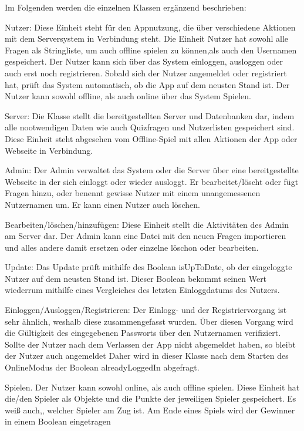\documentclass[fontsize=12pt,paper=a4,twoside]{scrartcl}
\begin{document}
Im Folgenden werden die einzelnen Klassen ergänzend beschrieben:

Nutzer:
Diese Einheit steht für den Appnutzung, die über verschiedene Aktionen
mit dem Serversystem in Verbindung steht. Die Einheit Nutzer hat sowohl 
alle Fragen als Stringliste, um auch offline spielen zu können,als auch 
den Usernamen gespeichert. 
Der Nutzer kann sich über das System einloggen, ausloggen oder auch erst noch 
registrieren.
Sobald sich der Nutzer angemeldet oder registriert hat, prüft das System automatisch,
ob die App auf dem neusten Stand ist. Der Nutzer kann sowohl offline, als auch online 
über das System Spielen.

Server:
Die Klasse stellt die bereitgestellten Server und Datenbanken dar, indem alle 
nootwendigen Daten wie auch Quizfragen und Nutzerlisten gespeichert sind. Diese Einheit
steht abgesehen vom Offline-Spiel mit allen Aktionen der App oder Webseite in Verbindung.

Admin: 
Der Admin verwaltet das System oder die Server über eine bereitgestellte Webseite in der
sich einloggt oder wieder ausloggt. Er bearbeitet/löscht oder fügt Fragen hinzu, oder 
benennt gewisse Nutzer mit einem unangemessenen Nutzernamen um. Er kann einen Nutzer auch
löschen.

Bearbeiten/löschen/hinzufügen:
Diese Einheit stellt die Aktivitäten des Admin am Server dar. Der Admin kann eine Datei 
mit den neuen Fragen importieren und alles andere damit ersetzen oder einzelne löschon 
oder bearbeiten.

Update:
Das Update prüft mithilfe des Boolean isUpToDate, ob der eingeloggte Nutzer auf dem neusten Stand ist.
Dieser Boolean bekommt seinen Wert wiederrum mithilfe eines Vergleiches des letzten Einloggdatums des
Nutzers.

Einloggen/Ausloggen/Registrieren:
Der Einlogg- und der Registriervorgang ist sehr ähnlich, weshalb diese zusammengefasst wurden. 
Über diesen Vorgang wird die Gültigkeit des eingegebenen Passworts über den Nutzernamen verifiziert.
Sollte der Nutzer nach dem Verlassen der App nicht abgemeldet haben, so bleibt der Nutzer auch angemeldet
Daher wird in dieser Klasse nach dem Starten des OnlineModus der Boolean alreadyLoggedIn abgefragt.

Spielen.
Der Nutzer kann sowohl online, als auch offline spielen. Diese Einheit hat die/den Spieler
als Objekte und die Punkte der jeweiligen Spieler gespeichert. Es weiß auch,, welcher Spieler am Zug ist.
Am Ende eines Spiels wird der Gewinner in einem Boolean eingetragen
\end{document}
